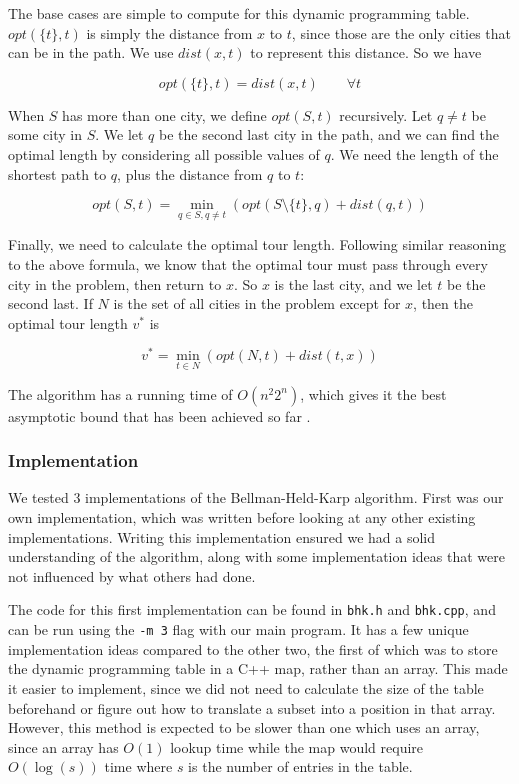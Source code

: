 \documentclass[11pt]{article}
\begin{document}
	The base cases are simple to compute for this dynamic programming table. $opt(\{ t \} , t)$ is simply the distance from $x$ to $t$, since those are the only cities that can be in the path. We use $dist(x,t)$ to represent this distance. So we have
	
	\[ opt(\{ t \}, t) = dist(x,t) \qquad \forall t \]
	
	When $S$ has more than one city, we define $opt(S,t)$ recursively. Let $q \neq t$ be some city in $S$. We let $q$ be the second last city in the path, and we can find the optimal length by considering all possible values of $q$. We need the length of the shortest path to $q$, plus the distance from $q$ to $t$:
	
	\[ opt(S,t) = \min_{q \in S, q \neq t} ( opt(S \setminus \{ t \} , q) + dist(q, t) ) \]
	
	Finally, we need to calculate the optimal tour length. Following similar reasoning to the above formula, we know that the optimal tour must pass through every city in the problem, then return to $x$. So $x$ is the last city, and we let $t$ be the second last. If $N$ is the set of all cities in the problem except for $x$, then the optimal tour length $v^*$ is
	
	\[ v^* = \min_{t \in N} ( opt(N , t) + dist(t, x) ) \]
	
	The algorithm has a running time of $O(n^2 2^n)$, which gives it the best asymptotic bound that has been achieved so far \cite{bico}.
	
	\subsubsection{Implementation}
	
	We tested 3 implementations of the Bellman-Held-Karp algorithm. First was our own implementation, which was written before looking at any other existing implementations. Writing this implementation ensured we had a solid understanding of the algorithm, along with some implementation ideas that were not influenced by what others had done.
	
	The code for this first implementation can be found in \texttt{bhk.h} and \texttt{bhk.cpp}, and can be run using the \texttt{-m 3} flag with our main program. It has a few unique implementation ideas compared to the other two, the first of which was to store the dynamic programming table in a C++ map, rather than an array. This made it easier to implement, since we did not need to calculate the size of the table beforehand or figure out how to translate a subset into a position in that array. However, this method is expected to be slower than one which uses an array, since an array has $O(1)$ lookup time while the map would require $O(\log(s))$ time where $s$ is the number of entries in the table.
	
\end{document}
